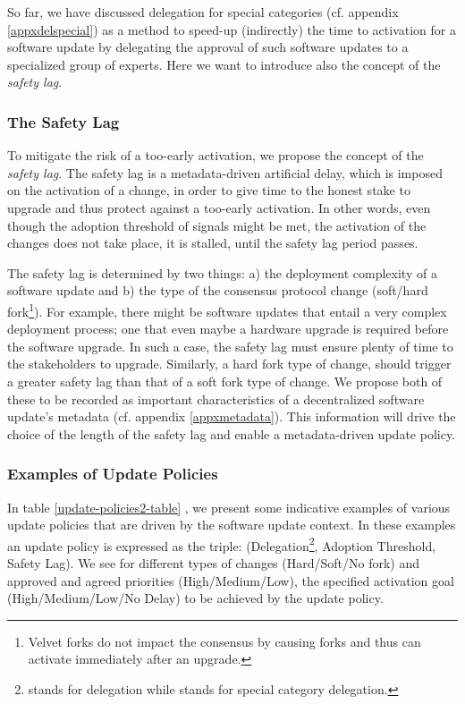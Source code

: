 So far, we have discussed delegation for special categories (cf. appendix \ref{appxdelspecial}) as a method to speed-up (indirectly) the time to activation for a software update by delegating the approval of such software updates to a specialized group of experts. Here we want to introduce also the concept of the \emph{safety lag}. %

\subsubsection{The Safety Lag}
To mitigate the risk of a too-early activation, %
we propose the concept of the \emph{safety lag}. The safety lag is a metadata-driven artificial delay, which is imposed on the activation of a change, in order to give time to the honest stake to upgrade and thus protect against a too-early activation. In other words, even though  the adoption threshold of signals might be met, the activation of the changes does not take place, it is stalled, until the safety lag period passes.

The safety lag is determined by two things: a) the deployment complexity of a software update and b) the type of the consensus protocol change (soft/hard fork\footnote{Velvet forks \cite{velvet} do not impact the consensus by causing forks and thus can activate immediately after an upgrade.}).
For example, there might be software updates that entail a very complex deployment process; one that even maybe a hardware upgrade is required before the software upgrade. In such a case, the safety lag must ensure plenty of time to the stakeholders to upgrade. Similarly, a hard fork type of change, should trigger a greater safety lag than that of a soft fork type of change. 
We propose both of these to be recorded as important characteristics of a decentralized software update's metadata (cf. appendix \ref{appxmetadata}). This information will drive the choice of the length of the safety lag and enable a metadata-driven update policy. %

\subsubsection{Examples of Update Policies}
 In table \ref{update-policies2-table} 
, we present some indicative examples of various update policies that are driven by the software update context. In these examples an update policy is expressed as the triple: (Delegation\footnote{ stands for delegation while  stands for special category delegation. }, Adoption Threshold, Safety Lag). We see for different types of changes (Hard/Soft/No fork) and approved and agreed priorities (High/Medium/Low), the specified activation goal (High/Medium/Low/No Delay) to be achieved by the update policy.

